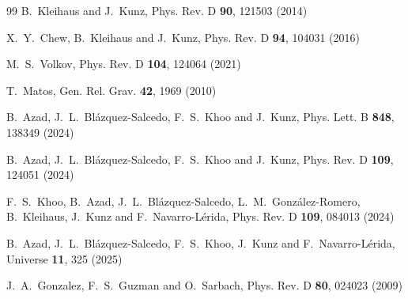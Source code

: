 \documentclass[11pt,a4paper]{article}
\begin{document}
\begin{thebibliography}{99}
B.~Kleihaus and J.~Kunz,
Phys. Rev. D \textbf{90}, 121503 (2014)

X.~Y.~Chew, B.~Kleihaus and J.~Kunz,
Phys. Rev. D \textbf{94}, 104031 (2016)

M.~S.~Volkov,
Phys. Rev. D \textbf{104}, 124064 (2021)


T.~Matos,
Gen. Rel. Grav. \textbf{42}, 1969 (2010)

B.~Azad, J.~L.~Bl\'azquez-Salcedo, F.~S.~Khoo and J.~Kunz,
Phys. Lett. B \textbf{848}, 138349 (2024)

B.~Azad, J.~L.~Bl{\'a}zquez-Salcedo, F.~S.~Khoo and J.~Kunz,
Phys. Rev. D \textbf{109}, 124051 (2024)

F.~S.~Khoo, B.~Azad, J.~L.~Bl\'azquez-Salcedo, L.~M.~Gonz\'alez-Romero, B.~Kleihaus, J.~Kunz and F.~Navarro-L\'erida,
Phys. Rev. D \textbf{109}, 084013 (2024)

B.~Azad, J.~L.~Bl{\'a}zquez-Salcedo, F.~S.~Khoo, J.~Kunz and F.~Navarro-L{\'e}rida,
Universe \textbf{11}, 325 (2025)

J.~A.~Gonzalez, F.~S.~Guzman and O.~Sarbach,
Phys. Rev. D \textbf{80}, 024023 (2009)



\end{thebibliography}
\end{document}

